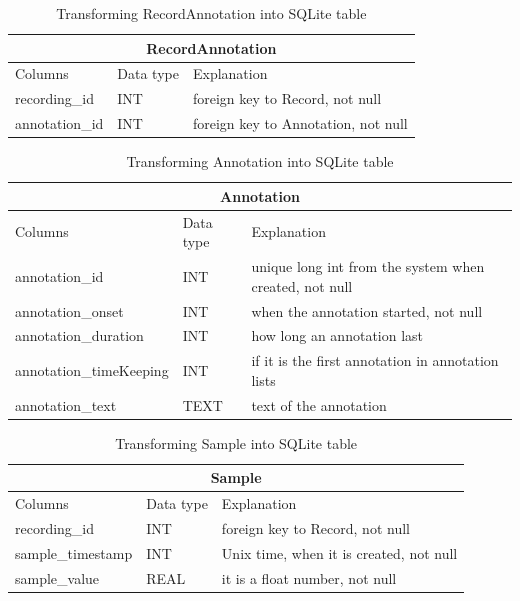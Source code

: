 \begin{table}
\begin{center}
\begin{tabular}{ |p{4cm}|p{1.8cm}|p{6.2cm}|  }
 \hline
 \multicolumn{3}{|c|}{RecordAnnotation} \\
 \hline
 Columns& Data type & Explanation \\
 \hline
 recording\_id& INT& foreign key to Record, not null\\
 annotation\_id& INT& foreign key to Annotation, not null\\
 \hline
\end{tabular}
\end{center}
\caption{Transforming RecordAnnotation into SQLite table}
\label{tab:RecordAnnotationTypeSQL}
\end{table}
\begin{table}
\begin{center}
\begin{tabular}{ |p{4cm}|p{1.8cm}|p{6.2cm}|  }
 \hline
 \multicolumn{3}{|c|}{Annotation} \\
 \hline
 Columns& Data type & Explanation \\
 \hline
 annotation\_id& INT& unique long int from the system when created, not null\\
 annotation\_onset& INT& when the annotation started, not null\\
 annotation\_duration& INT& how long an annotation last\\
 annotation\_timeKeeping& INT& if it is the first annotation in annotation lists\\
 annotation\_text& TEXT& text of the annotation\\
 \hline
\end{tabular}
\end{center}
\caption{Transforming Annotation into SQLite table}
\label{tab:AnnotationTypeSQL}
\end{table}
\begin{table}
\begin{center}
\begin{tabular}{ |p{4cm}|p{1.8cm}|p{6.2cm}|  }
 \hline
 \multicolumn{3}{|c|}{Sample} \\
 \hline
 Columns& Data type & Explanation \\
 \hline
 recording\_id& INT& foreign key to Record, not null\\
 sample\_timestamp& INT& Unix time, when it is created, not null\\
 sample\_value& REAL& it is a float number, not null\\
 \hline
\end{tabular}
\end{center}
\caption{Transforming Sample into SQLite table}
\label{tab:SampleTypeSQL}
\end{table}
